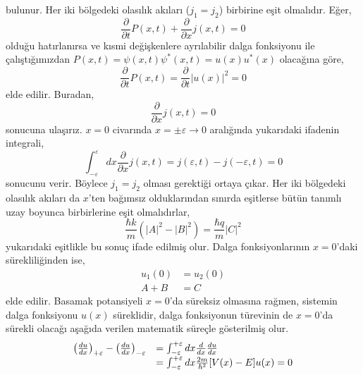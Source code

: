\documentclass[a4paper,12pt, twoside]{article}
\begin{document}
bulunur. Her iki bölgedeki olasılık akıları ($j_1 = j_2$) birbirine eşit olmalıdır. Eğer,
\begin{equation}
\frac { \partial } { \partial t } P ( x , t ) + \frac { \partial } { \partial x } j ( x , t ) = 0
\end{equation}
olduğu hatırlanırsa ve kısmi değişkenlere ayrılabilir dalga fonksiyonu ile çalıştığımızdan $P(x, t) = \psi(x,t) \psi^*(x,t) = u(x) u^*(x)$ olacağına göre,
\begin{equation}\label{key}
\frac { \partial } { \partial t } P ( x , t ) = \frac { \partial } { \partial t } |u ( x)|^2 = 0
\end{equation}
elde edilir. Buradan,
\begin{equation}
\frac { \partial } { \partial x } j ( x , t ) = 0
\end{equation}
sonucuna ulaşırız. $x=0$ civarında $x=\pm\varepsilon \rightarrow 0$ aralığında yukarıdaki ifadenin integrali,
\begin{equation}
\int^{\varepsilon}_{-\varepsilon} dx \frac { \partial } { \partial x } j ( x , t ) = j (\varepsilon  , t ) - j ( -\varepsilon , t ) = 0
\end{equation}
sonucunu verir. Böylece $j_1 = j_2$ olması gerektiği ortaya çıkar. Her iki bölgedeki olasılık akıları da $x$'ten bağımsız olduklarından sınırda eşitlerse bütün tanımlı uzay boyunca birbirlerine eşit olmalıdırlar,
\begin{equation}
\frac { \hbar k } { m } \left( | A | ^ { 2 }  - | B | ^ { 2 } \right) = \frac { \hbar q } { m } | C | ^ { 2 }
\end{equation}
yukarıdaki eşitlikle bu sonuç ifade edilmiş olur. Dalga fonksiyonlarının $x=0$'daki sürekliliğinden ise,
\begin{align}
u_1(0) &= u_2(0) \\
A + B  &= C
\end{align}
elde edilir. Basamak potansiyeli $x=0$'da süreksiz olmasına rağmen, sistemin dalga fonksiyonu $u(x)$ süreklidir, dalga fonksiyonun türevinin de $x=0$'da sürekli olacağı aşağıda verilen matematik süreçle gösterilmiş olur.
\begin{equation}
\begin{array} { r l } { \left( \frac { d u } { d x } \right) _ { +\varepsilon } - \left( \frac { d u } { d x } \right) _ { - \varepsilon } } & { = \int _ { - \varepsilon } ^ { +\varepsilon } d x \frac { d } { d x } \frac { d u } { d x } } \\ { } & { = \int _ { - \varepsilon } ^ { +\varepsilon } d x \frac { 2 m } { \hbar ^ { 2 } } [ V ( x ) - E ] u ( x ) = 0 } \end{array}
\end{equation}
\end{document}
